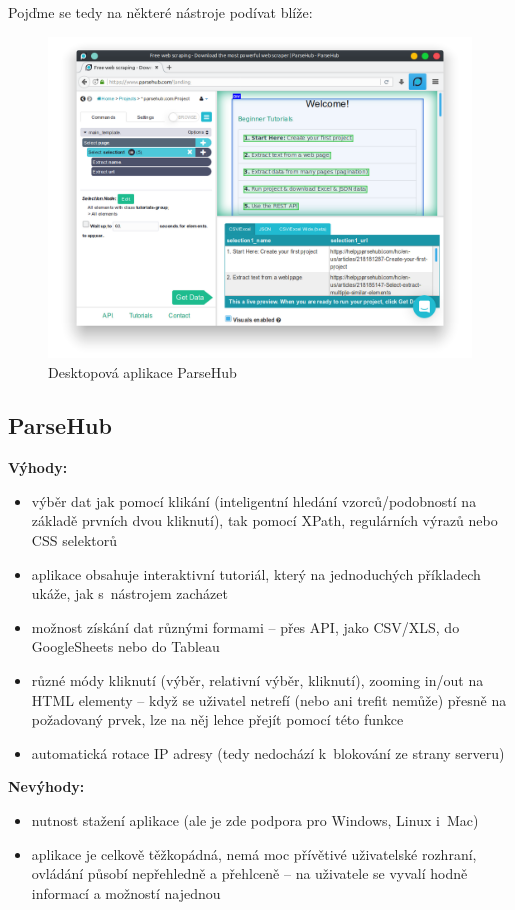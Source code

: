\documentclass[thesis=B,czech]{FITthesis}[2012/06/26]
\begin{document}
Poj\v{d}me se tedy na některé nástroje podívat blíže:

\begin{figure}
	\includegraphics[width=\linewidth]{images/ParseHub.png}
	\caption{Desktopová aplikace ParseHub~\cite[snímek pořídil autor]{parsehub}}
	\label{fig:parseHub}
\end{figure}
\subsection{ParseHub}
\textbf{Výhody:}
\begin{itemize}
	\item výběr dat jak pomocí klikání (inteligentní hledání vzorců/podobností na základě prvních dvou kliknutí), tak pomocí XPath, regulárních výrazů nebo CSS selektorů
	\item aplikace obsahuje interaktivní tutoriál, který na jednoduchých příkladech ukáže, jak s~nástrojem zacházet
	\item možnost získání dat různými formami -- přes API, jako CSV/XLS, do GoogleSheets nebo do Tableau
	\item různé módy kliknutí (výběr, relativní výběr, kliknutí), zooming in/out na HTML elementy -- když se uživatel netrefí (nebo ani trefit nemůže) přesně na požadovaný prvek, lze na něj lehce přejít pomocí této funkce
	\item automatická rotace IP adresy (tedy nedochází k~blokování ze strany serveru)
\end{itemize}
\textbf{Nevýhody:}
\begin{itemize}
	\item nutnost stažení aplikace (ale je zde podpora pro Windows, Linux i~Mac)
	\item aplikace je celkově těžkopádná, nemá moc přívětivé uživatelské rozhraní, ovládání působí nepřehledně a přehlceně -- na uživatele se vyvalí hodně informací a možností najednou
\end{itemize}
\end{document}
